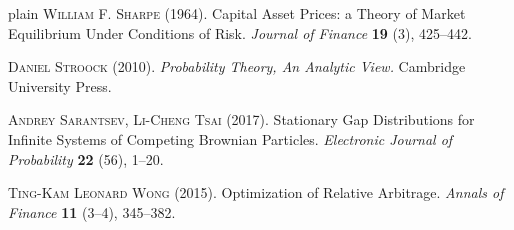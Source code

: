 \documentclass[12pt]{amsart}
\begin{document}
\begin{thebibliography}{plain}
 \textsc{William F. Sharpe} (1964). Capital Asset Prices: a Theory of Market Equilibrium Under Conditions of Risk. \textit{Journal of Finance} \textbf{19} (3), 425--442.

 \textsc{Daniel Stroock} (2010). \textit{Probability Theory, An Analytic View.} Cambridge University Press.

 \textsc{Andrey Sarantsev, Li-Cheng Tsai} (2017). Stationary Gap Distributions for Infinite Systems of Competing Brownian Particles. \textit{Electronic Journal of Probability} \textbf{22} (56), 1--20.

 \textsc{Ting-Kam Leonard Wong} (2015). Optimization of Relative Arbitrage. \textit{Annals of Finance} \textbf{11} (3--4), 345--382.

\end{thebibliography}
\end{document}

